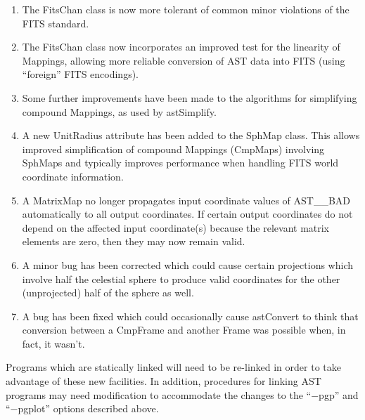 \documentclass[twoside,11pt]{article}
\newcommand{\htmlref}[2]{#1}
\begin{document}
\begin{enumerate}
\item The FitsChan class is now more tolerant of common minor
violations of the FITS standard.

\item The FitsChan class now incorporates an improved test for the
linearity of Mappings, allowing more reliable conversion of AST data
into FITS (using ``foreign'' FITS encodings).

\item Some further improvements have been made to the algorithms for
simplifying compound Mappings, as used by \htmlref{astSimplify}{astSimplify}.

\item A new \htmlref{UnitRadius}{UnitRadius} attribute has been added to the \htmlref{SphMap}{SphMap}
class. This allows improved simplification of compound Mappings
(CmpMaps) involving SphMaps and typically improves performance when
handling FITS world coordinate information.

\item A \htmlref{MatrixMap}{MatrixMap} no longer propagates input coordinate values of
AST\_\_BAD automatically to all output coordinates. If certain output
coordinates do not depend on the affected input coordinate(s) because
the relevant matrix elements are zero, then they may now remain valid.

\item A minor bug has been corrected which could cause certain
projections which involve half the celestial sphere to produce valid
coordinates for the other (unprojected) half of the sphere as well.

\item A bug has been fixed which could occasionally cause \htmlref{astConvert}{astConvert}
to think that conversion between a \htmlref{CmpFrame}{CmpFrame} and another Frame was
possible when, in fact, it wasn't.
\end{enumerate}

Programs which are statically linked will need to be re-linked in
order to take advantage of these new facilities. In addition,
procedures for linking AST programs may need modification to
accommodate the changes to the ``$-$pgp'' and ``$-$pgplot'' options
described above.

\end{document}

